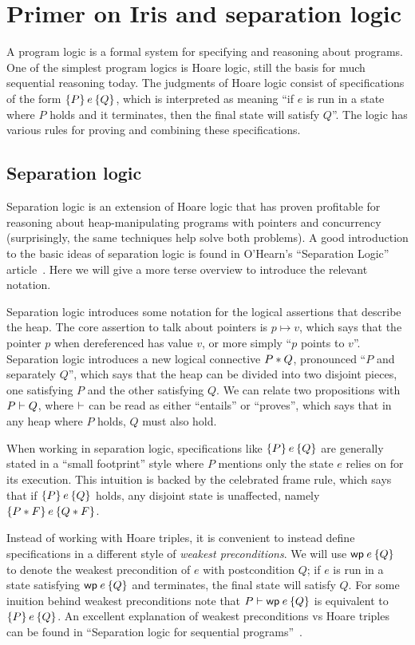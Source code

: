 \section{Primer on Iris and separation logic}

A program logic is a formal system for specifying and reasoning about programs.
One of the simplest program logics is Hoare logic, still the basis for much
sequential reasoning today. The judgments of Hoare logic consist of
specifications of the form $\hoare{P}{e}{Q}$, which is interpreted as meaning
``if $e$ is run in a state where $P$ holds and it terminates, then the final
state will satisfy $Q$''. The logic has various rules for proving and combining
these specifications.

\subsection{Separation logic}

Separation logic is an extension of Hoare logic that has proven profitable for
reasoning about heap-manipulating programs with pointers and concurrency
(surprisingly, the same techniques help solve both problems). A good
introduction to the basic ideas of separation logic is found in O'Hearn's
``Separation Logic'' article~\cite{ohearn:seplogic}. Here we will give a more
terse overview to introduce the relevant notation.

Separation logic introduces some notation for the logical assertions that
describe the heap. The core assertion to talk about pointers is $p \mapsto v$,
which says that the pointer $p$ when dereferenced has value $v$, or more simply
``$p$ points to $v$''. Separation logic introduces a new logical connective
$P * Q$, pronounced ``$P$ and separately $Q$'', which says that the heap can
be divided into two disjoint pieces, one satisfying $P$ and the other satisfying
$Q$. We can relate two propositions with $P \vdash Q$, where $\vdash$ can be
read as either ``entails'' or ``proves'', which says that in any heap where $P$
holds, $Q$ must also hold.

When working in separation logic, specifications like $\hoare{P}{e}{Q}$ are
generally stated in a ``small footprint'' style where $P$ mentions only the
state $e$ relies on for its execution. This intuition is backed by the
celebrated frame rule, which says that if $\hoare{P}{e}{Q}$ holds, any disjoint
state is unaffected, namely $\hoare{P \sep F}{e}{Q \sep F}$.

Instead of working with Hoare triples, it is convenient to instead define
specifications in a different style of \emph{weakest preconditions}. We will use
$\wpre{e}{Q}$ to denote the weakest precondition of $e$ with postcondition $Q$;
if $e$ is run in a state satisfying $\wpre{e}{Q}$ and terminates, the final
state will satisfy $Q$. For some inuition behind weakest preconditions note that
$P \proves \wpre{e}{Q}$ is equivalent to $\hoare{P}{e}{Q}$. An excellent
explanation of weakest preconditions vs Hoare triples can be found in
``Separation logic for sequential programs''~\cite{chargueraud:seq-seplogic}.

